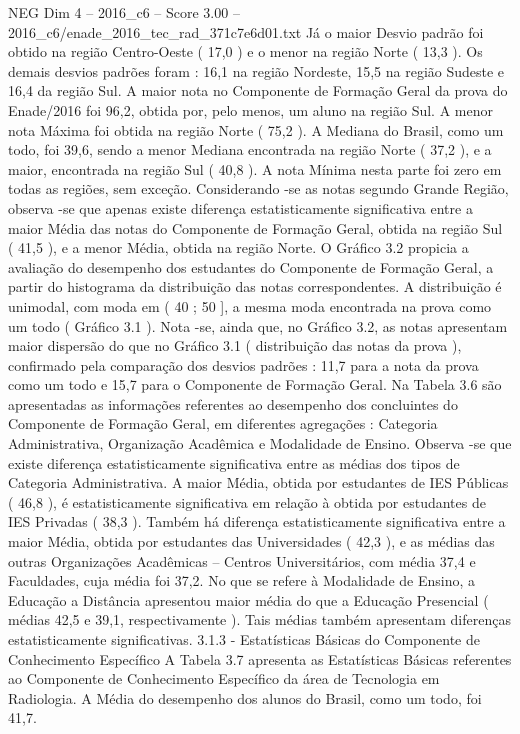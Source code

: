 \begin{textsample}{NEG Dim 4 – 2016\_c6 – Score 3.00 – 2016\_c6/enade\_2016\_tec\_rad\_371c7e6d01.txt}
Já o maior Desvio padrão foi obtido na região Centro-Oeste ( 17,0 ) e o menor na região Norte ( 13,3 ).
Os demais desvios padrões foram : 16,1 na região Nordeste, 15,5 na região Sudeste e 16,4 da região Sul.
A maior nota no Componente de Formação Geral da prova do Enade/2016 foi 96,2, obtida por, pelo menos, um aluno na região Sul.
A menor nota Máxima foi obtida na região Norte ( 75,2 ).
A Mediana do Brasil, como um todo, foi 39,6, sendo a menor Mediana encontrada na região Norte ( 37,2 ), e a maior, encontrada na região Sul ( 40,8 ).
A nota Mínima nesta parte foi zero em todas as regiões, sem exceção.
Considerando -se as notas segundo Grande Região, observa -se que apenas existe diferença estatisticamente significativa entre a maior Média das notas do Componente de Formação Geral, obtida na região Sul ( 41,5 ), e a menor Média, obtida na região Norte.
O Gráfico 3.2 propicia a avaliação do desempenho dos estudantes do Componente de Formação Geral, a partir do histograma da distribuição das notas correspondentes.
A distribuição é unimodal, com moda em ( 40 ; 50 ], a mesma moda encontrada na prova como um todo ( Gráfico 3.1 ).
Nota -se, ainda que, no Gráfico 3.2, as notas apresentam maior dispersão do que no Gráfico 3.1 ( distribuição das notas da prova ), confirmado pela comparação dos desvios padrões : 11,7 para a nota da prova como um todo e 15,7 para o Componente de Formação Geral.
Na Tabela 3.6 são apresentadas as informações referentes ao desempenho dos concluintes do Componente de Formação Geral, em diferentes agregações : Categoria Administrativa, Organização Acadêmica e Modalidade de Ensino.
Observa -se que existe diferença estatisticamente significativa entre as médias dos tipos de Categoria Administrativa.
A maior Média, obtida por estudantes de IES Públicas ( 46,8 ), é estatisticamente significativa em relação à obtida por estudantes de IES Privadas ( 38,3 ).
Também há diferença estatisticamente significativa entre a maior Média, obtida por estudantes das Universidades ( 42,3 ), e as médias das outras Organizações Acadêmicas – Centros Universitários, com média 37,4 e Faculdades, cuja média foi 37,2.
No que se refere à Modalidade de Ensino, a Educação a Distância apresentou maior média do que a Educação Presencial ( médias 42,5 e 39,1, respectivamente ).
Tais médias também apresentam diferenças estatisticamente significativas. 3.1.3 - Estatísticas Básicas do Componente de Conhecimento Específico A Tabela 3.7 apresenta as Estatísticas Básicas referentes ao Componente de Conhecimento Específico da área de Tecnologia em Radiologia.
A Média do desempenho dos alunos do Brasil, como um todo, foi 41,7.

\end{textsample}
